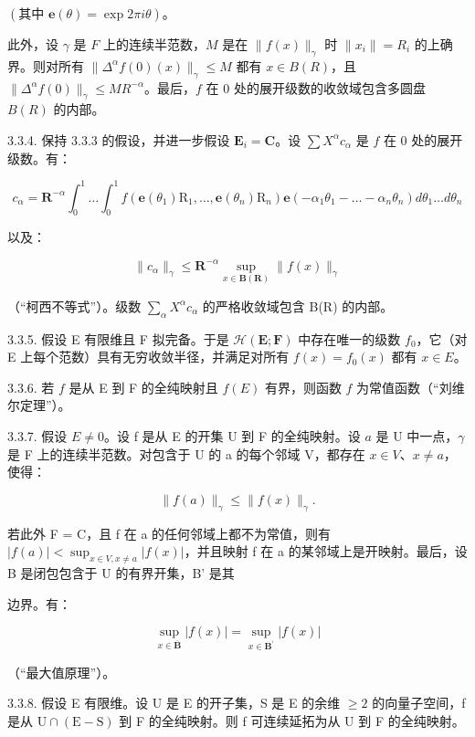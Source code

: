 \((\text{其中 } \mathbf{e}(\theta) = \exp 2\pi i \theta)\)。

此外，设 \(\gamma\) 是 \(F\) 上的连续半范数，\(M\) 是在 \(\|f(x)\|_{\gamma}\) 时 \(\|x_{i}\|=R_{i}\) 的上确界。则对所有 \(\|\Delta^{\alpha}f(0)(x)\|_{\gamma}\leqslant M\) 都有 \(x\in B(R)\)，且 \(\|\Delta^{\alpha}f(0)\|_{\gamma}\leqslant MR^{-\alpha}\)。最后，\(f\) 在 0 处的展开级数的收敛域包含多圆盘 \(B(R)\) 的内部。

3.3.4. 保持 3.3.3 的假设，并进一步假设 \(\mathbf{E}_i = \mathbf{C}\)。设 \(\sum X^{\alpha}c_{\alpha}\) 是 \(f\) 在 0 处的展开级数。有：

\[
c _ {\alpha} = \mathbf {R} ^ {- \alpha} \int_ {0} ^ {1} \dots \int_ {0} ^ {1} f (\mathbf {e} (\theta_ {1}) \mathrm{R} _ {1}, \dots , \mathbf {e} (\theta_ {n}) \mathrm{R} _ {n}) \mathbf {e} (- \alpha_ {1} \theta_ {1} - \dots - \alpha_ {n} \theta_ {n}) d \theta_ {1} \dots d \theta_ {n}
\]

以及：

\[
\| c _ {\alpha} \| _ {\gamma} \leqslant \mathbf {R} ^ {- \alpha} \sup _ {x \in \mathbf {B} (\mathbf {R})} \| f (x) \| _ {\gamma}
\]

（“柯西不等式”）。级数 \(\sum_{\alpha} X^{\alpha} c_{\alpha}\) 的严格收敛域包含 B(R) 的内部。

3.3.5. 假设 E 有限维且 F 拟完备。于是 \(\mathcal{H}(\mathbf{E};\mathbf{F})\) 中存在唯一的级数 \(f_{0}\)，它（对 E 上每个范数）具有无穷收敛半径，并满足对所有 \(f(x)=f_{0}(x)\) 都有 \(x\in E\)。

3.3.6. 若 \(f\) 是从 E 到 F 的全纯映射且 \(f(E)\) 有界，则函数 \(f\) 为常值函数（“刘维尔定理”）。

3.3.7. 假设 \(E \neq 0\)。设 f 是从 E 的开集 U 到 F 的全纯映射。设 \(a\) 是 U 中一点，\(\gamma\) 是 F 上的连续半范数。对包含于 U 的 a 的每个邻域 V，都存在 \(x \in V\)、\(x \neq a\)，使得：

\[
\| f (a) \| _ {\gamma} \leqslant \| f (x) \| _ {\gamma}.
\]

若此外 F = C，且 f 在 a 的任何邻域上都不为常值，则有 \(|f(a)| < \sup_{x \in V, x \neq a} |f(x)|\)，并且映射 f 在 a 的某邻域上是开映射。最后，设 B 是闭包包含于 U 的有界开集，B' 是其

边界。有：

\[
\sup _ {x \in \overline {{\mathbf {B}}}} | f (x) | = \sup _ {x \in \mathbf {B} ^ {\prime}} | f (x) |
\]

（“最大值原理”）。

3.3.8. 假设 E 有限维。设 U 是 E 的开子集，S 是 E 的余维 \(\geqslant2\) 的向量子空间，f 是从 \(\mathrm{U}\cap(\mathrm{E}-\mathrm{S})\) 到 F 的全纯映射。则 f 可连续延拓为从 U 到 F 的全纯映射。

